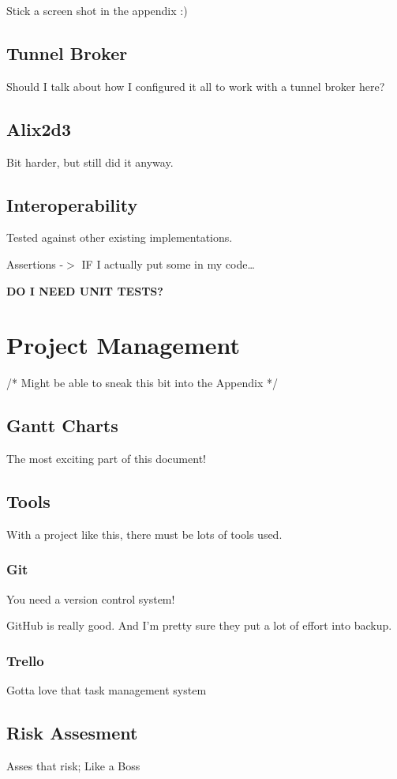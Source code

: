 \documentclass[12pt]{report}
\begin{document}
Stick a screen shot in the appendix :)

\section{Tunnel Broker}
Should I talk about how I configured it all to work with a tunnel broker here?

\section{Alix2d3}
Bit harder, but still did it anyway.

\section{Interoperability}

Tested against other existing implementations.

Assertions -$>$ IF I actually put some in my code\ldots

\textbf{DO I NEED UNIT TESTS?}

\chapter{Project Management}
/* Might be able to sneak this bit into the Appendix */

\section{Gantt Charts}
The most exciting part of this document!

\section{Tools}
With a project like this, there must be lots of tools used. 

\subsection{Git}
You need a version control system!

GitHub is really good. And I'm pretty sure they put a lot of effort into backup.

\subsection{Trello}
Gotta love that task management system

\section{Risk Assesment}
Asses that risk; Like a Boss
\end{document}
